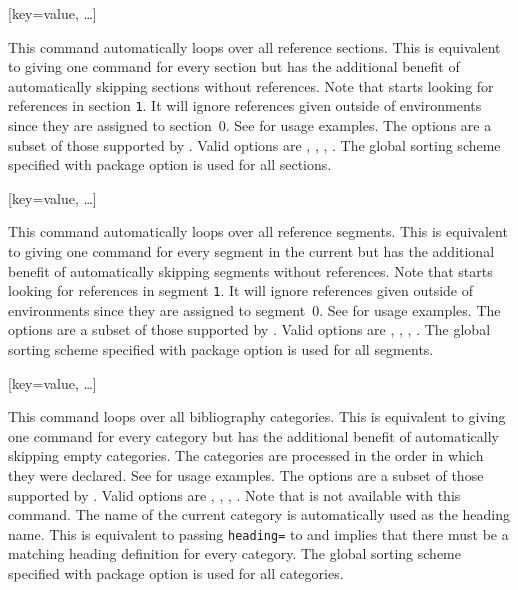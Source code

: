 \documentclass{ltxdockit}[2011/03/25]
\begin{document}
\begin{ltxsyntax}

[key=value, \dots]

This command automatically loops over all reference sections. This is equivalent to giving one  command for every section but has the additional benefit of automatically skipping sections without references. Note that  starts looking for references in section \texttt{1}. It will ignore references given outside of  environments since they are assigned to section~0. See  for usage examples. The options are a subset of those supported by . Valid options are , , , . The global sorting scheme specified with package  option is used for all sections.

[key=value, \dots]

This command automatically loops over all reference segments. This is equivalent to giving one  command for every segment in the current  but has the additional benefit of automatically skipping segments without references. Note that  starts looking for references in segment \texttt{1}. It will ignore references given outside of  environments since they are assigned to segment~0. See  for usage examples. The options are a subset of those supported by . Valid options are , , , . The global sorting scheme specified with package  option is used for all segments.

[key=value, \dots]

This command loops over all bibliography categories. This is equivalent to giving one  command for every category but has the additional benefit of automatically skipping empty categories. The categories are processed in the order in which they were declared. See  for usage examples. The options are a subset of those supported by . Valid options are , , , . Note that  is not available with this command. The name of the current category is automatically used as the heading name. This is equivalent to passing \texttt{heading=} to  and implies that there must be a matching heading definition for every category. The global sorting scheme specified with package  option is used for all categories.


\end{ltxsyntax}
\end{document}
